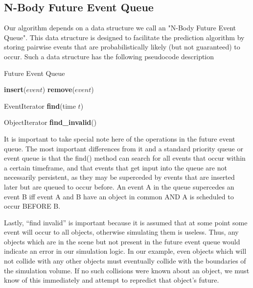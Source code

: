 \documentclass[conference]{IEEEtran}
\begin{document}
\subsection{N-Body Future Event Queue}
\label{sec:neq}
Our algorithm depends on a data structure we call an "N-Body Future Event Queue".  This data structure is designed to facilitate the prediction algorithm
by storing pairwise events that are probabilistically likely (but not guaranteed) to occur.  Such a data structure has the following pseudocode description
\begin{algorithm}
\caption{Future Event Queue}
\begin{algorithmic}
\STATE {}
\STATE \textbf{insert}($event$)
\STATE {}
\STATE \textbf{remove}($event$)
	
\STATE {}
\STATE EventIterator \textbf{find}(time $t$)

\STATE {}
\STATE ObjectIterator \textbf{find\_invalid}()
\end{algorithmic}
\end{algorithm}

It is important to take special note here of the operations in the future event queue.  The most important differences from it and a standard priority queue or event queue
is that the find() method can search for all events that occur within a certain timeframe, and that events that get input into the queue are not necessarily persistent, as they 
may be superceded by events that are inserted later but are queued to occur before.  An event A in the queue supercedes an event B iff event A and B have an object in common AND A is scheduled to occur BEFORE B.

Lastly, ``find invalid'' is important because it is assumed that at some point some event will occur to all objects, otherwise simulating them is 
useless.  Thus, any objects which are in the scene but not present in the future event queue would indicate an error in our simulation logic.  In our example, even objects which
will not collide with any other objects must eventually collide with the boundaries of the simulation volume.  If no such collisions were known about
an object, we must know of this immediately and attempt to repredict that object's future.
\end{document}
